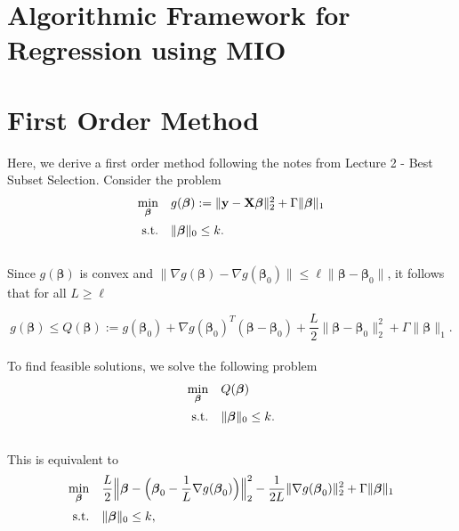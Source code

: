 \documentclass[12pt]{article}
\newcommand{\M}{\mathbf}
\newcommand{\MS}{\boldsymbol}
\newcommand{\1}{\mathds{1}}
\begin{document}
\section{Algorithmic Framework for Regression using MIO}



\section{First Order Method}

Here, we derive a first order method following the notes from Lecture 2 - Best Subset Selection.  Consider the problem
\begin{equation}
\begin{array}{rll}
  \min \limits_{\MS \beta} & g(\MS \beta) := \|\M y - \M X \MS \beta \|_2^2 + \Gamma \| \MS \beta \|_1 \vspace{5pt}\\
  \text{s.t.} & \| \MS \beta \|_0 \le k.
\end{array}
\end{equation}\\

Since $g(\MS \beta)$ is convex and $\|\nabla g(\MS \beta) - \nabla g(\MS \beta_0)\| \le \ell \| \MS \beta - \MS \beta_0\|$, it follows that for all $L \ge \ell$

\begin{equation}
g(\MS \beta) \le Q(\MS \beta) := g(\MS \beta_0) + \nabla g(\MS \beta_0)^T(\MS \beta - \MS \beta_0) + \frac{L}{2} \|\MS \beta - \MS \beta_0\|_2^2 + \Gamma \| \MS \beta \|_1.
\end{equation}\\

To find feasible solutions, we solve the following problem
\begin{equation}
\begin{array}{rll}
  \min \limits_{\MS \beta} & Q(\MS \beta) \vspace{5pt}\\
  \text{s.t.} & \| \MS \beta \|_0 \le k.
\end{array}
\end{equation}\\

This is equivalent to
\begin{equation}
\begin{array}{rll}
  \min \limits_{\MS \beta} & \displaystyle \frac{L}{2}\Big\|\MS \beta - \Big(\MS \beta_0 - \frac{1}{L} \nabla g(\MS \beta_0)\Big) \Big\|_2^2 - \frac{1}{2L} \|\nabla g(\MS \beta_0) \|_2^2 + \Gamma \| \MS \beta \|_1 \vspace{5pt}\\
  \text{s.t.} & \| \MS \beta \|_0 \le k,
\end{array}
\end{equation}\\
\end{document}
